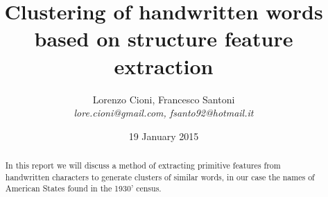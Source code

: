 \documentclass[a4paper,12pt]{article}
\title{\bf Clustering of handwritten words based on structure feature extraction}
\date {19 January 2015}
\author{Lorenzo Cioni, Francesco Santoni\\\textit{{\small lore.cioni@gmail.com, fsanto92@hotmail.it}}}
\begin{document}
\maketitle

\begin{abstract}
In this report we will discuss a method of extracting primitive features from handwritten characters to generate clusters of similar words, in our case the names of American States found in the 1930' census.
\end{abstract}

\tableofcontents









\end{document}
